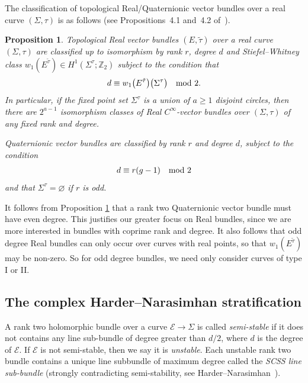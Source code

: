 \documentclass[pdftex]{sigma}
\numberwithin{equation}{section}
\newtheorem{Proposition}[Theorem]{Proposition}
\begin{document}
The classif\/ication of topological Real/Quaternionic vector bundles over a real curve $(\Sigma, \tau)$ is as follows (see Propositions~4.1 and~4.2 of~\cite{BHH}).

\begin{Proposition}\label{arecbu}
Topological Real vector bundles $(E,\tilde{\tau})$ over a real curve $(\Sigma, \tau)$ are classified up to isomorphism by rank $r$, degree $d$ and Stiefel--Whitney class $w_1(E^{\tilde{\tau}}) \in H^1(\Sigma^{\tau};{\mathbb Z}_2)$ subject to the condition that \begin{gather*}d \equiv w_1\big(E^{\tilde{\tau}}\big)\big(\Sigma^{\tau}\big) \quad {\rm mod}~2. \end{gather*}
In particular, if the fixed point set $\Sigma^{\tau}$ is a union of $a\geq 1$ disjoint circles, then there are $2^{a-1}$ isomorphism classes of Real $C^{\infty}$-vector bundles over $(\Sigma,\tau)$ of any fixed rank and degree.

Quaternionic vector bundles are classified by rank $r$ and degree $d$, subject to the condition
\begin{gather*}%
d \equiv r(g-1) \quad {\rm mod}~2
\end{gather*}
and that $\Sigma^{\tau} = \varnothing$ if $r$ is odd.
\end{Proposition}

\begin{Remark}\label{quatnotint}
It follows from Proposition \ref{arecbu} that a rank two Quaternionic vector bundle must have even degree. This justif\/ies our greater focus on Real bundles, since we are more interested in bundles with coprime rank and degree. It also follows that odd degree Real bundles can only occur over curves with real points, so that $w_1(E^{\tilde{\tau}})$ may be non-zero. So for odd degree bundles, we need only consider curves of type I or II.
\end{Remark}

\subsection{The complex Harder--Narasimhan stratif\/ication}\label{HNstratC}
A rank two holomorphic bundle over a curve ${\mathcal E} \rightarrow \Sigma$ is called \emph{semi-stable} if it does not contains any line sub-bundle of degree greater than $d/2$, where $d$ is the degree of ${\mathcal E}$. If ${\mathcal E}$ is not semi-stable, then we say it is \emph{unstable}. Each unstable rank two bundle contains a unique line subbundle of maximum degree called the \emph{SCSS line sub-bundle} (strongly contradicting semi-stability, see Harder--Narasimhan~\cite{HN}).
\end{document}
